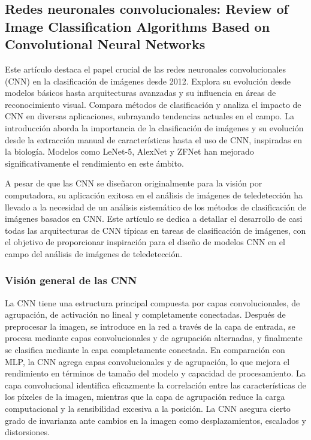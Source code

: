 \subsection{Redes neuronales convolucionales: Review of Image Classification Algorithms Based on Convolutional Neural Networks \citep*{tecnica2}}
Este artículo destaca el papel crucial de las redes neuronales convolucionales (CNN) en la clasificación de imágenes desde 2012. Explora su evolución desde modelos básicos hasta arquitecturas avanzadas y su influencia en áreas de reconocimiento visual. Compara métodos de clasificación y analiza el impacto de CNN en diversas aplicaciones, subrayando tendencias actuales en el campo. La introducción aborda la importancia de la clasificación de imágenes y su evolución desde la extracción manual de características hasta el uso de CNN, inspiradas en la biología. Modelos como LeNet-5, AlexNet y ZFNet han mejorado significativamente el rendimiento en este ámbito.

A pesar de que las CNN se diseñaron originalmente para la visión por computadora, su aplicación exitosa en el análisis de imágenes de teledetección ha llevado a la necesidad de un análisis sistemático de los métodos de clasificación de imágenes basados en CNN. Este artículo se dedica a detallar el desarrollo de casi todas las arquitecturas de CNN típicas en tareas de clasificación de imágenes, con el objetivo de proporcionar inspiración para el diseño de modelos CNN en el campo del análisis de imágenes de teledetección.


\subsubsection{Visión general de las CNN}
La CNN tiene una estructura principal compuesta por capas convolucionales, de agrupación, de activación no lineal y completamente conectadas. Después de preprocesar la imagen, se introduce en la red a través de la capa de entrada, se procesa mediante capas convolucionales y de agrupación alternadas, y finalmente se clasifica mediante la capa completamente conectada. En comparación con MLP, la CNN agrega capas convolucionales y de agrupación, lo que mejora el rendimiento en términos de tamaño del modelo y capacidad de procesamiento. La capa convolucional identifica eficazmente la correlación entre las características de los píxeles de la imagen, mientras que la capa de agrupación reduce la carga computacional y la sensibilidad excesiva a la posición. La CNN asegura cierto grado de invarianza ante cambios en la imagen como desplazamientos, escalados y distorsiones.

